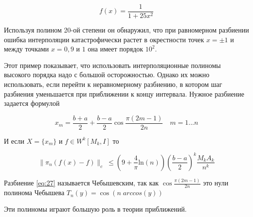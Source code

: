 \begin{equation}
f(x) = \frac{1}{1+25x^2}
\end{equation}

Используя полином 20-ой степени он обнаружил, что при равномерном разбиении ошибка интерполяции катастрофически растет в окрестности точек $x = \pm 1$ и между точками $x = 0,9$ и $1$ она имеет порядок $10^2$.

Этот пример показывает, что использовать интерполяционные полиномы высокого порядка надо с большой осторожностью. Однако их можно использовать, если перейти к неравномерному разбиению, в котором шаг разбиения уменьшается при приближении к концу интервала.
Нужное разбиение задается формулой 

\begin{equation}\label{eq:27}
x_m = \frac{b+a}{2} + \frac{b-a}{2} \cos \frac{\pi(2m-1)}{2n} \quad m = 1...n
\end{equation}

И если $X = \{x_m\}$ и $f \in W^k[M_k, I]$ то 

\begin{equation}
\parallel \pi_n (f(x) -f) \parallel_c \; \leq \left(
9+ \frac{4}{\pi}\mathrm{ln} (n)\right) \left( \frac{b-a}{2}\right)^k \frac{M_kA_k}{n^k}
\end{equation}

Разбиение \ref{eq:27} называется Чебышевским, так как $\cos \frac{\pi(2m-1)}{2n}$ это нули полинома Чебышева $T_n(y) = \cos(n \; arccos(y))$

Эти полиномы играют большую роль в теории приближений.




